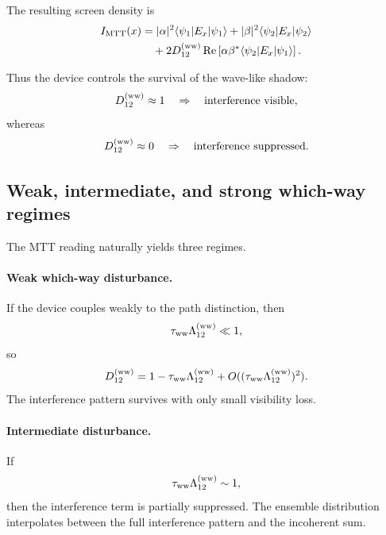 \documentclass[11pt]{article}
\begin{document}
The resulting screen density is
\begin{align}
  I_{\rm MTT}(x)
  &=
  |\alpha|^2\langle\psi_1|E_x|\psi_1\rangle
  +
  |\beta|^2\langle\psi_2|E_x|\psi_2\rangle
  \nonumber\\
  &\quad+
  2D_{12}^{(\rm ww)}
  \operatorname{Re}
  \left[
    \alpha\beta^\ast
    \langle\psi_2|E_x|\psi_1\rangle
  \right].
  \label{eq:double-slit-mtt-damped}
\end{align}

Thus the device controls the survival of the wave-like shadow:
\begin{equation}
  D_{12}^{(\rm ww)}\approx1
  \quad\Rightarrow\quad
  \text{interference visible},
\end{equation}
whereas
\begin{equation}
  D_{12}^{(\rm ww)}\approx0
  \quad\Rightarrow\quad
  \text{interference suppressed}.
\end{equation}

\subsection{Weak, intermediate, and strong which-way regimes}
\label{subsec:which-way-regimes}

The MTT reading naturally yields three regimes.

\paragraph{Weak which-way disturbance.}
If the device couples weakly to the path distinction, then
\begin{equation}
  \tau_{\rm ww}\Lambda_{12}^{(\rm ww)}\ll1,
\end{equation}
so
\begin{equation}
  D_{12}^{(\rm ww)}
  =
  1-\tau_{\rm ww}\Lambda_{12}^{(\rm ww)}
  +O((\tau_{\rm ww}\Lambda_{12}^{(\rm ww)})^2).
\end{equation}
The interference pattern survives with only small visibility loss.

\paragraph{Intermediate disturbance.}
If
\begin{equation}
  \tau_{\rm ww}\Lambda_{12}^{(\rm ww)}\sim1,
\end{equation}
then the interference term is partially suppressed. The ensemble distribution interpolates
between the full interference pattern and the incoherent sum.
\end{document}
